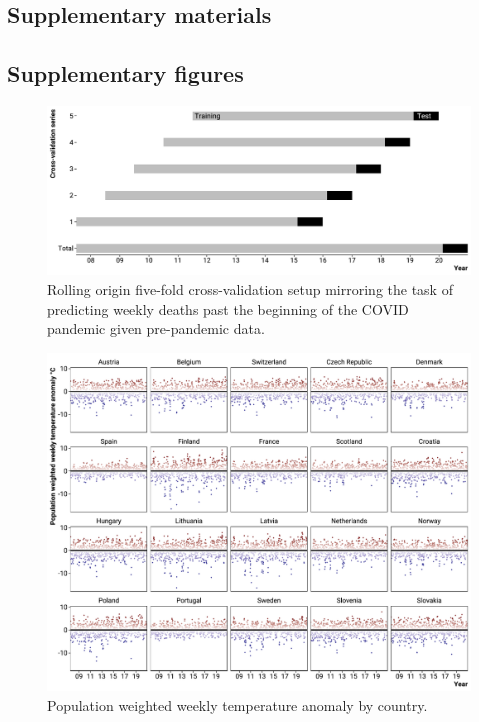 \documentclass[12pt]{article}
\begin{document}
\clearpage




\clearpage


\renewcommand\thefigure{S.\arabic{figure}}
\setcounter{figure}{0}

\begin{appendix}

\section*{Supplementary materials}

\subsection*{Supplementary figures}

\begin{figure}
\caption{Rolling origin five-fold cross-validation setup mirroring the task of predicting weekly deaths past the beginning of the COVID pandemic given pre-pandemic data.}
\includegraphics{cvsetup.pdf}
\end{figure}

\begin{figure}
  \caption{Population weighted weekly temperature anomaly by country.}
  \includegraphics{tanomaly.pdf}
  \end{figure}


\end{appendix}
\end{document}
